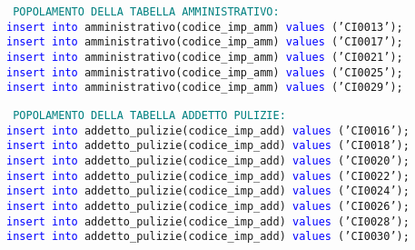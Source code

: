 \documentclass{article}
\begin{document}
    \begin{flushleft}
        \texttt{
        \textcolor{teal}{POPOLAMENTO DELLA TABELLA AMMINISTRATIVO:} \\
        \hspace*{0.5em}\textcolor{blue}{insert into} amministrativo(codice\_imp\_amm) \textcolor{blue}{values} ('CI0013'); \\
        \hspace*{0.5em}\textcolor{blue}{insert into} amministrativo(codice\_imp\_amm) \textcolor{blue}{values} ('CI0017'); \\
        \hspace*{0.5em}\textcolor{blue}{insert into} amministrativo(codice\_imp\_amm) \textcolor{blue}{values} ('CI0021'); \\
        \hspace*{0.5em}\textcolor{blue}{insert into} amministrativo(codice\_imp\_amm) \textcolor{blue}{values} ('CI0025'); \\
        \hspace*{0.5em}\textcolor{blue}{insert into} amministrativo(codice\_imp\_amm) \textcolor{blue}{values} ('CI0029'); \\}
    \end{flushleft}

    \begin{flushleft}
        \texttt{
        \textcolor{teal}{POPOLAMENTO DELLA TABELLA ADDETTO PULIZIE:} \\
        \hspace*{0.5em}\textcolor{blue}{insert into} addetto\_pulizie(codice\_imp\_add) \textcolor{blue}{values} ('CI0016'); \\
        \hspace*{0.5em}\textcolor{blue}{insert into} addetto\_pulizie(codice\_imp\_add) \textcolor{blue}{values} ('CI0018'); \\
        \hspace*{0.5em}\textcolor{blue}{insert into} addetto\_pulizie(codice\_imp\_add) \textcolor{blue}{values} ('CI0020'); \\
        \hspace*{0.5em}\textcolor{blue}{insert into} addetto\_pulizie(codice\_imp\_add) \textcolor{blue}{values} ('CI0022'); \\
        \hspace*{0.5em}\textcolor{blue}{insert into} addetto\_pulizie(codice\_imp\_add) \textcolor{blue}{values} ('CI0024'); \\
        \hspace*{0.5em}\textcolor{blue}{insert into} addetto\_pulizie(codice\_imp\_add) \textcolor{blue}{values} ('CI0026'); \\
        \hspace*{0.5em}\textcolor{blue}{insert into} addetto\_pulizie(codice\_imp\_add) \textcolor{blue}{values} ('CI0028'); \\
        \hspace*{0.5em}\textcolor{blue}{insert into} addetto\_pulizie(codice\_imp\_add) \textcolor{blue}{values} ('CI0030'); \\}
    \end{flushleft}
\end{document}
